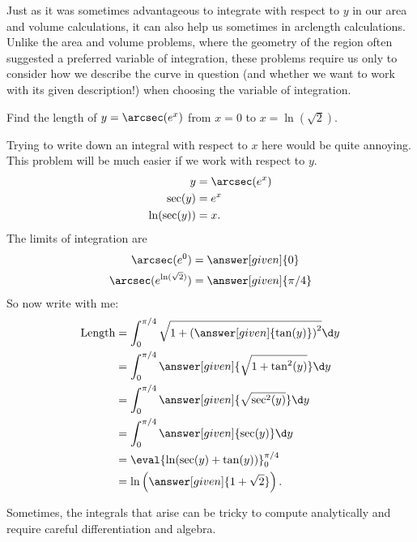 \documentclass{ximera}
\begin{document}
Just as it was sometimes advantageous to integrate with respect to $y$ in our area and volume calculations, it can also help us sometimes in arclength calculations.  Unlike the area and volume problems, where the geometry of the region often suggested a preferred variable of integration, these problems require us only to consider how we describe the curve in question (and whether we want to work with its given description!) when choosing the variable of integration.
 
\begin{example}
  Find the length of $y = \arcsec(e^x)$ from $x= 0$ to  $x=\ln(\sqrt{2})$.
  \begin{explanation}
    Trying to write down an integral with respect to $x$ here would be quite annoying.  This problem will be much easier if we work with respect to $y$. 
    \begin{align*}
      y &= \arcsec(e^x)\\
      \sec(y) &= e^x\\
      \ln(\sec(y)) &= x.
    \end{align*}
    The limits of integration are
    \begin{align*}
      \arcsec(e^0) &= \answer[given]{0}\\
      \arcsec(e^{\ln(\sqrt{2})}) &= \answer[given]{\pi/4}
    \end{align*}
    So now write with me:
    \begin{align*}
      \text{Length} &= \int_0^{\pi/4} \sqrt{1+\left( \answer[given]{\tan(y)} \right)^2} \d y\\
      &=\int_0^{\pi/4} \answer[given]{\sqrt{1+\tan^2(y)}}\d y\\
      &=\int_0^{\pi/4} \answer[given]{\sqrt{\sec^2(y)}}\d y\\
      &=\int_0^{\pi/4} \answer[given]{\sec(y)} \d y\\
      &=\eval{\ln(\sec(y)+\tan(y))}_0^{\pi/4}\\
      &=\ln \left(\answer[given]{1+\sqrt{2}} \right).
    \end{align*}
  \end{explanation}
\end{example}

Sometimes, the integrals that arise can be tricky to compute analytically and require careful differentiation and algebra.
\end{document}
